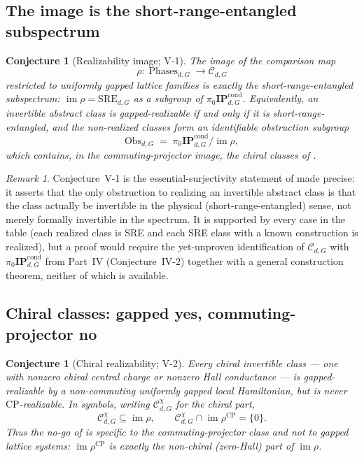 \documentclass[12pt]{article}
\newcommand{\Phases}{\operatorname{Phases}}    %
\newcommand{\IPcond}{\mathbf{IP}^{\mathrm{cond}}}  %
\newcommand{\real}{\rho}                         %
\newcommand{\SRE}{\mathrm{SRE}}                  %
\newcommand{\CP}{\mathrm{CP}}                    %
\newcommand{\im}{\operatorname{im}}
\newtheorem{conjecture}[theorem]{Conjecture}
\theoremstyle{definition}
\theoremstyle{remark}
\newtheorem{remark}[theorem]{Remark}
\begin{document}
\subsection{The image is the short-range-entangled subspectrum}

\begin{conjecture}[Realizability image; V-1]
\label{conj:V1}
The image of the comparison map
\[
  \real\colon\Phases_{d,G}\to\mathcal{C}_{d,G}
\]
restricted to uniformly gapped lattice families is exactly the short-range-entangled subspectrum:
$\im\real=\SRE_{d,G}$ as a subgroup of $\pi_0\IPcond_{d,G}$. Equivalently, an invertible
abstract class is gapped-realizable if and only if it is short-range-entangled, and the
non-realized classes form an identifiable obstruction subgroup
\[
  \mathrm{Obs}_{d,G} \;=\; \pi_0\IPcond_{d,G}\big/\im\real ,
\]
which contains, in the commuting-projector image, the chiral classes of .
\end{conjecture}

\begin{remark}
Conjecture~V-1 is the essential-surjectivity statement of  made precise:
it asserts that the only obstruction to realizing an invertible abstract class is that the
class actually be invertible in the physical (short-range-entangled) sense, not merely
formally invertible in the spectrum. It is supported by every case in the table (each
realized class is SRE and each SRE class with a known construction is realized), but a
proof would require the yet-unproven identification of $\mathcal{C}_{d,G}$ with
$\pi_0\IPcond_{d,G}$ from Part~IV (Conjecture~IV-2) together with a general construction
theorem, neither of which is available.
\end{remark}

\subsection{Chiral classes: gapped yes, commuting-projector no}

\begin{conjecture}[Chiral realizability; V-2]
\label{conj:V2}
Every chiral invertible class --- one with nonzero chiral central charge or nonzero Hall
conductance --- is gapped-realizable by a non-commuting uniformly gapped local Hamiltonian,
but is never $\CP$-realizable. In symbols, writing $\mathcal{C}^{\chi}_{d,G}$ for the chiral
part,
\[
  \mathcal{C}^{\chi}_{d,G}\subseteq\im\real, \qquad
  \mathcal{C}^{\chi}_{d,G}\cap\im\real^{\CP}=\{0\}.
\]
Thus the no-go of  is specific to the commuting-projector class and not to
gapped lattice systems: $\im\real^{\CP}$ is exactly the non-chiral (zero-Hall) part of
$\im\real$.
\end{conjecture}
\end{document}
